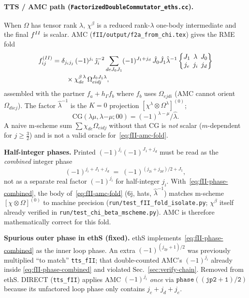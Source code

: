 \documentclass[enabledeprecatedfontcommands]{scrartcl}
\newcommand{\codename}[1]{\texttt{#1}}
\newcommand{\MyRomanNum}[1]{%
  \ifcase#1\or I\or II\or III\or IV\or V\or VI\or VII\or VIII\or IX\or X\else #1\fi}
\newcommand{\sixj}[6]{\begingroup\setlength{\arraycolsep}{0.2em}%
  \begin{Bmatrix} #1 & #2 & #3 \\ #4 & #5 & #6 \end{Bmatrix}\endgroup}
\begin{document}
\paragraph{TTS / AMC path
(\codename{FactorizedDoubleCommutator\_eths.cc}).}
\label{sec:code-fII-tts}
When $\Omega$ has tensor rank $\lambda$, $\chi^\beta$ is a reduced rank-$\lambda$
one-body intermediate and the final $f^{\MyRomanNum{2}}$ is scalar.
AMC (\codename{fII/output/f2a\_from\_chi.tex}) gives the RME fold
\begin{equation}
\label{eq:fII-amc-fold}
\begin{aligned}
  f^{(II)}_{ij}
  &=
  \delta_{j_i j_j}\,(-1)^{j_i}\,\hat\jmath_i^{-2}
  \sum_{de J_0 J_1}
  (-1)^{J_1+j_d}\,
  \hat J_0\hat J_1\hat\lambda^{-1}
  \sixj{J_1}{\lambda}{J_0}{j_e}{j_i}{j_d}
  \\
  &\qquad\times
  \chi^{\beta\,\lambda}_{de}\,
  \Omega^{J_0 J_1\lambda}_{eidj},
\end{aligned}
\end{equation}
assembled with the partner $f_a+h_\Gamma f_b$ where $f_b$ uses
$\Omega_{ejdi}$ (AMC cannot orient $\Omega_{diej}$).
The factor $\hat\lambda^{-1}$ is the $K{=}0$ projection
$[\chi^\lambda\otimes\Omega^\lambda]^{(0)}$;
\[
  \mathrm{CG}(\lambda\mu,\lambda{-\mu};00)=(-1)^{\lambda-\mu}/\hat\lambda.
\]
A naive m-scheme sum $\sum\chi_{de}\Omega_{eidj}$ without that CG is
\emph{not} scalar ($m$-dependent for $j\ge\tfrac32$) and is not a valid
oracle for~\eqref{eq:fII-amc-fold}.

\textbf{Half-integer phases.}
Printed $(-1)^{j_i}(-1)^{J_1+j_d}$ must be read as the \emph{combined}
integer phase
\begin{equation}
\label{eq:fII-phase-combined}
  (-1)^{j_i+J_1+j_d}
  \;=\;
  (-1)^{(j_{2i}+j_{2d})/2+J_1},
\end{equation}
not as a separate real factor $(-1)^{j_i}$ for half-integer $j_i$.
With~\eqref{eq:fII-phase-combined}, the body of~\eqref{eq:fII-amc-fold}
(6j, hats, $\hat\lambda^{-1}$) matches m-scheme
$[\chi\otimes\Omega]^{(0)}$ to machine precision
(\codename{run/test\_fII\_fold\_isolate.py}; $\chi^\beta$ itself already
verified in \codename{run/test\_chi\_beta\_mscheme.py}).
AMC is therefore mathematically correct for this fold.

\textbf{Spurious outer phase in ethS (fixed).}
ethS implements~\eqref{eq:fII-phase-combined} as the inner loop phase.
An extra $(-1)^{(j_{2p}+1)/2}$ was previously multiplied ``to match''
\codename{tts\_fII}; that double-counted AMC's $(-1)^{j_i}$ already inside
\eqref{eq:fII-phase-combined} and violated Sec.~\ref{sec:verify-chain}.
Removed from ethS. DIRECT (\codename{tts\_fII}) applies AMC $(-1)^{j_i}$
\emph{once} via $\mathtt{phase((jp2+1)/2)}$ because its unfactored loop phase
only contains $j_c{+}j_d{+}j_e$.
\end{document}
